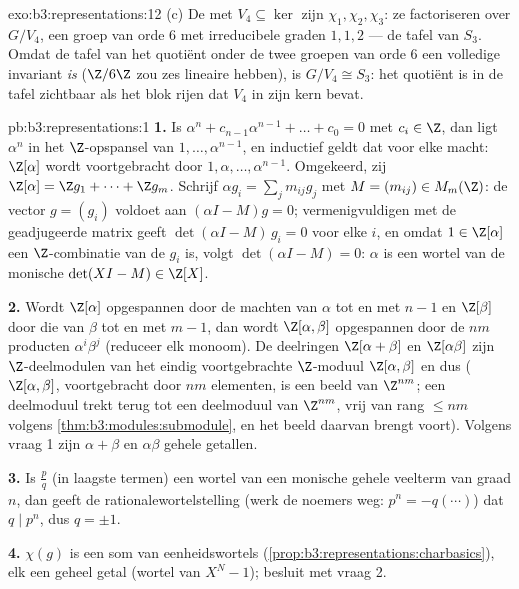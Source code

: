 \begin{solution}{exo:b3:representations:12}
(c) De  met $V_4 \subseteq \ker$ zijn $\chi_1, \chi_2,
\chi_3$: ze factoriseren over $G/V_4$, een groep van orde $6$ met
irreducibele graden $1, 1, 2$ --- de tafel van $S_3$. Omdat de
tafel van het quotiënt onder de twee groepen van orde $6$ een
volledige invariant \emph{is} ($\Z/6\Z$ zou zes lineaire 
hebben), is $G/V_4 \cong S_3$: het quotiënt is in de tafel
zichtbaar als het blok rijen dat $V_4$ in zijn kern bevat.
\end{solution}

\begin{solution}{pb:b3:representations:1}
\textbf{1.} Is $\alpha^n + c_{n-1}\alpha^{n-1} + \dots + c_0 = 0$
met $c_i \in \Z$, dan ligt $\alpha^n$ in het $\Z$-opspansel van
$1, \dots, \alpha^{n-1}$, en inductief geldt dat voor elke macht:
$\Z[\alpha]$ wordt voortgebracht door $1, \alpha, \dots,
\alpha^{n-1}$. Omgekeerd, zij $\Z[\alpha] = \Z g_1 + \dots + \Z
g_m$. Schrijf $\alpha g_i = \sum_j m_{ij}g_j$ met $M = (m_{ij})
\in M_m(\Z)$: de vector $g = (g_i)$ voldoet aan $(\alpha I - M)g =
0$; vermenigvuldigen met de geadjugeerde matrix geeft $\det(\alpha
I - M)\,g_i = 0$ voor elke $i$, en omdat $1 \in \Z[\alpha]$ een
$\Z$-combinatie van de $g_i$ is, volgt $\det(\alpha I - M) = 0$:
$\alpha$ is een wortel van de monische $\det(XI - M) \in \Z[X]$.

\textbf{2.} Wordt $\Z[\alpha]$ opgespannen door de machten van
$\alpha$ tot en met $n-1$ en $\Z[\beta]$ door die van $\beta$ tot
en met $m - 1$, dan wordt $\Z[\alpha,\beta]$ opgespannen door de
$nm$ producten $\alpha^i\beta^j$ (reduceer elk monoom). De
deelringen $\Z[\alpha + \beta]$ en $\Z[\alpha\beta]$ zijn
$\Z$-deelmodulen van het eindig voortgebrachte $\Z$-moduul
$\Z[\alpha, \beta]$ en dus  ($\Z[\alpha,
\beta]$, voortgebracht door $nm$ elementen, is een beeld van
$\Z^{nm}$; een deelmoduul trekt terug tot een deelmoduul van
$\Z^{nm}$, vrij van rang $\leq nm$ volgens
\cref{thm:b3:modules:submodule}, en het beeld daarvan brengt
voort). Volgens vraag 1 zijn $\alpha + \beta$ en $\alpha\beta$
gehele  getallen.

\textbf{3.} Is $\frac pq$ (in laagste termen) een wortel van een
monische gehele veelterm van graad $n$, dan geeft de
rationalewortelstelling (werk de noemers weg: $p^n = -q(\cdots)$)
dat $q \mid p^n$, dus $q = \pm1$.

\textbf{4.} $\chi(g)$ is een som van eenheidswortels
(\cref{prop:b3:representations:charbasics}), elk een geheel
 getal (wortel van $X^N - 1$); besluit met vraag 2.


\end{solution}
